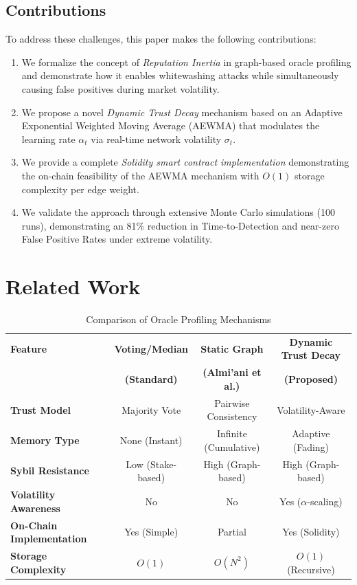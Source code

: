 \documentclass{ieeeaccess}
\begin{document}
\subsection{Contributions}
To address these challenges, this paper makes the following contributions:
\begin{enumerate}
    \item We formalize the concept of \textit{Reputation Inertia} in graph-based oracle profiling and demonstrate how it enables whitewashing attacks while simultaneously causing false positives during market volatility.
    \item We propose a novel \textit{Dynamic Trust Decay} mechanism based on an Adaptive Exponential Weighted Moving Average (AEWMA) that modulates the learning rate $\alpha_t$ via real-time network volatility $\sigma_t$.
    \item We provide a complete \textit{Solidity smart contract implementation} demonstrating the on-chain feasibility of the AEWMA mechanism with $O(1)$ storage complexity per edge weight.
    \item We validate the approach through extensive Monte Carlo simulations (100 runs), demonstrating an 81\% reduction in Time-to-Detection and near-zero False Positive Rates under extreme volatility.
\end{enumerate}


\section{Related Work}
\label{sec:related_work}

\begin{table}[t!]
\caption{Comparison of Oracle Profiling Mechanisms}
\centering
\setlength{\tabcolsep}{8pt}
\begin{tabular}{|l|c|c|c|}
\hline
\textbf{Feature} & \textbf{Voting/Median} & \textbf{Static Graph \cite{b7}} & \textbf{Dynamic Trust Decay} \\
 & \textbf{(Standard)} & \textbf{(Almi'ani et al.)} & \textbf{(Proposed)} \\
\hline
\textbf{Trust Model} & Majority Vote & Pairwise Consistency & Volatility-Aware \\
\hline
\textbf{Memory Type} & None (Instant) & Infinite (Cumulative) & Adaptive (Fading) \\
\hline
\textbf{Sybil Resistance} & Low (Stake-based) & High (Graph-based) & High (Graph-based) \\
\hline
\textbf{Volatility Awareness}& No & No & Yes ($\alpha$-scaling) \\
\hline
\textbf{On-Chain Implementation} & Yes (Simple) & Partial & Yes (Solidity) \\
\hline
\textbf{Storage Complexity} & $O(1)$ & $O(N^2)$ & $O(1)$ (Recursive) \\
\hline
\end{tabular}
\label{tab:comparison}
\end{table}
\end{document}

